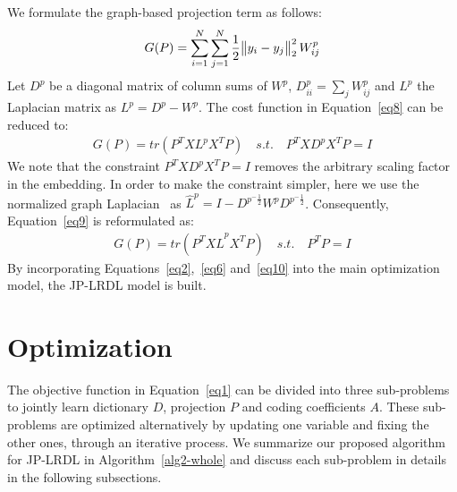 \documentclass[journal]{IEEEtran}
\DeclarePairedDelimiter\norm{\lVert}{\rVert}
\begin{document}
We formulate the graph-based projection term as follows:
\begin{gather}
G(P) = \sum\limits_{i=1}^N \sum\limits_{j=1}^N \frac{1}{2} \norm[\big]{y_i - y_j}_{2}^2 \, W^p_{ij}
\label{eq8}
\end{gather}
Let $D^p$ be a diagonal matrix of column sums of $W^p$, $D^p_{ii} = \sum\nolimits_{j} W^p_{ij}$ and $L^p$ the Laplacian matrix as $L^p = D^p-W^p$. The cost function in Equation~\eqref{eq8} can be reduced to:
\begin{gather}
G(P) = tr(P^T X L^p X^T P) \quad s.t. \quad  P^T X D^p X^T P=I
\label{eq9}
\end{gather}
We note that the constraint $P^T X D^p X^T P =I$ removes the arbitrary scaling factor in the embedding. In order to make the constraint simpler, here we use the normalized graph Laplacian~\cite{Norm-Lap} as $\hat{L}^{p} = I - D^{p^-\frac {1}{2}} W^p D^{p^-\frac {1}{2}}$. Consequently, Equation~\eqref{eq9} is reformulated as:
\begin{gather}
G(P) = tr(P^T X \hat{L}^{p} X^T P)  \quad  s.t. \quad  P^T P=I
\label{eq10}
\end{gather}
By incorporating Equations~\eqref{eq2},~\eqref{eq6} and~\eqref{eq10} into the main optimization model, the JP-LRDL model is built.
\section{Optimization}
\label{sec:opt}
The objective function in Equation~\eqref{eq1} can be divided into three sub-problems to jointly learn dictionary $D$, projection $P$ and coding coefficients $A$. These sub-problems are optimized alternatively by updating one variable and fixing the other ones, through an iterative process. We summarize our proposed algorithm for JP-LRDL in Algorithm~\ref{alg2-whole} and discuss each sub-problem in details in the following subsections.
\end{document}
